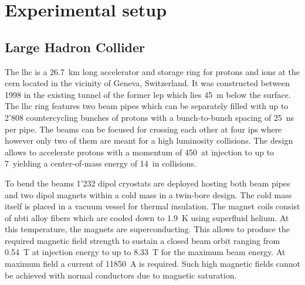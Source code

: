 \chapter{Experimental setup}


\section{Large Hadron Collider}

The \gls{lhc} is a 26.7~km long accelerator and storage ring for \glspl{proton} and \glspl{ion} at the \gls{cern} located in the vicinity of Geneva, Switzerland. It was constructed between 1998 in the existing tunnel of the former \gls{lep} which lies 45~m below the surface. The \gls{lhc} ring features two beam pipes which can be separately filled with up to 2'808 countercycling bunches of protons with a bunch-to-bunch spacing of 25~ns per pipe. The beams can be focused for crossing each other at four \glspl{ip} where however only two of them are meant for a high luminosity collisions. The design allows to accelerate protons with a momentum of 450~\GeV at injection to up to 7~\TeV yielding a center-of-mass energy of 14~\TeV in collisions.

To bend the beams 1'232 dipol cryostats are deployed hosting both beam pipes and two dipol magnets within a cold mass in a twin-bore design. The cold mass itself is placed in a vacuum vessel for thermal insulation. The magnet coils consist of \gls{nbti} alloy fibers which are cooled down to 1.9~K using superfluid helium. At this temperature, the magnets are superconducting. This allows to produce the required magnetic field strength to sustain a closed beam orbit ranging from 0.54~T at injection energy to up to 8.33~T for the maximum beam energy. At maximum field a current of 11850~A is required. Such high magnetic fields cannot be achieved with normal conductors due to magnetic saturation. 

